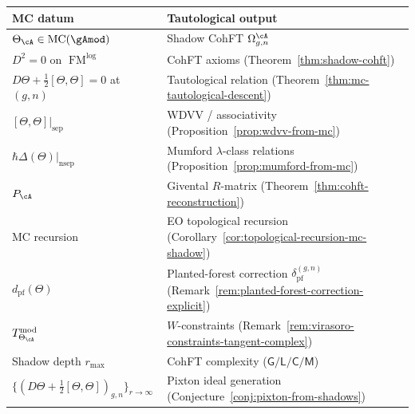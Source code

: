 \begin{remark}\label{rem:chriss-ginzburg-tautological-dictionary}
\begin{center}
\renewcommand{\arraystretch}{1.2}
\begin{tabular}{ll}
\textbf{MC datum} & \textbf{Tautological output} \\
\hline
$\Theta_\cA \in \operatorname{MC}(\gAmod)$ & Shadow CohFT
  $\Omega_{g,n}^{\cA}$ \\
$D^2 = 0$ on $\operatorname{FM}^{\mathrm{log}}$ & CohFT axioms
  (Theorem~\ref{thm:shadow-cohft}) \\
$D\Theta + \tfrac{1}{2}[\Theta,\Theta] = 0$ at $(g,n)$
  & Tautological relation
  (Theorem~\ref{thm:mc-tautological-descent}) \\
$[\Theta,\Theta]|_{\mathrm{sep}}$ & WDVV / associativity
  (Proposition~\ref{prop:wdvv-from-mc}) \\
$\hbar\Delta(\Theta)|_{\mathrm{nsep}}$ & Mumford $\lambda$-class
  relations (Proposition~\ref{prop:mumford-from-mc}) \\
$P_\cA$ & Givental $R$-matrix
  (Theorem~\ref{thm:cohft-reconstruction}) \\
MC recursion & EO topological recursion
  (Corollary~\ref{cor:topological-recursion-mc-shadow}) \\
$d_{\mathrm{pf}}(\Theta)$
  & Planted-forest correction
  $\delta_{\mathrm{pf}}^{(g,n)}$
  (Remark~\ref{rem:planted-forest-correction-explicit}) \\
$T^{\mathrm{mod}}_{\Theta_\cA}$
  & $W$-constraints
  (Remark~\ref{rem:virasoro-constraints-tangent-complex}) \\
Shadow depth $r_{\max}$ & CohFT complexity
  ($\mathsf{G}/\mathsf{L}/\mathsf{C}/\mathsf{M}$) \\
$\bigl\{(D\Theta + \tfrac{1}{2}[\Theta,\Theta])_{g,n}\bigr\}_{r \to \infty}$
  & Pixton ideal generation
  (Conjecture~\ref{conj:pixton-from-shadows})
\end{tabular}
\end{center}
\end{remark}

